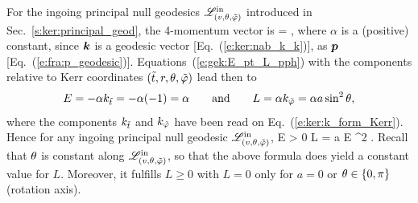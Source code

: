 \begin{example} \label{x:gek:ingoing_null_E_L}
For the ingoing principal null geodesics $\mathscr{L}^{\rm in}_{(v,\theta,{\tilde\varphi})}$
introduced in Sec.~\ref{s:ker:principal_geod}, the 4-momentum vector
is
\be \label{e:gek:p_alpha_k}
     = \alpha {} ,
\ee
where $\alpha$ is a (positive) constant, since $\bm{k}$ is a geodesic vector
[Eq.~(\ref{e:ker:nab_k_k})], as $\bm{p}$ [Eq.~(\ref{e:fra:p_geodesic})].
Equations~(\ref{e:gek:E_pt_L_pph}) with the components relative to Kerr coordinates
$({\tilde t}, r, \theta, {\tilde\varphi})$ lead then to
\[
    E = - \alpha k_{{\tilde t}} = - \alpha(-1) = \alpha \qquad\mbox{and}\qquad
   L = \alpha k_{{\tilde\varphi}} = \alpha a \sin^2\theta,
\]
where the components $k_{{\tilde t}}$ and $k_{{\tilde\varphi}}$
have been read on Eq.~(\ref{e:ker:k_form_Kerr}).
Hence for any ingoing principal null geodesic $\mathscr{L}^{\rm in}_{(v,\theta,{\tilde\varphi})}$,
\be \label{e:gek:ingoing_null_E_L}
    E > 0 \qand L = a E \sin^2 \th .
\ee
Recall that $\theta$ is constant along $\mathscr{L}^{\rm in}_{(v,\theta,{\tilde\varphi})}$, so that
the above formula does yield a constant value for $L$. Moreover, it fulfills
$L\geq 0$ with $L=0$ only for $a=0$ or $\theta\in\{0,\pi\}$ (rotation axis).
\end{example}

